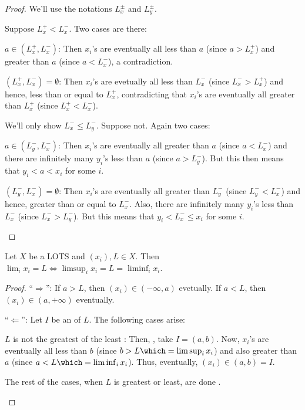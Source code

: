 	\begin{proof}
		We'll use the notations $L^\pm_x$ and $L^\pm_y$.
		\begin{mylist}
			\item Suppose $L^+_x < L^-_x$. Two cases are there:
			\begin{mylist}
				\item $a\in (L^+_x, L^-_x)$: Then $x_i$'s are eventually all less than $a$ (since $a > L^+_x$) and greater than $a$ (since $a < L^-_x$), a contradiction.
				
				\item $(L^+_x, L^-_x) = \emptyset$: Then $x_i$'s are evetually all less than $L^-_x$ (since $L^-_x > L^+_x$) and hence, less than or equal to $L^+_x$, contradicting that $x_i$'s are eventually all greater than $L^+_x$ (since $L^+_x < L^-_x$).
			\end{mylist}
			
			
			\item We'll only show $L^-_x\le L^-_y$. Suppose not. Again two cases:
			\begin{mylist}
				\item $a\in (L^-_y, L^-_x)$: Then $x_i$'s are eventually all greater than $a$ (since $a < L^-_x$) and there are infinitely many $y_i$'s less than $a$ (since $a > L^-_y$). But this then means that $y_i < a < x_i$ for some $i$.
				
				\item $(L^-_y, L^-_x) = \emptyset$: Then $x_i$'s are eventually all greater than $L^-_y$ (since $L^-_y < L^-_x$) and hence, greater than or equal to $L^-_x$. Also, there are infinitely many $y_i$'s less than $L^-_x$ (since $L^-_x > L^-_y$). But this means that $y_i < L^-_x\le x_i$ for some $i$.
				\qedhere
			\end{mylist}
		\end{mylist}
	\end{proof}
	
	
	\begin{prp}
		Let $X$ be a LOTS and $(x_i), L\in X$. Then $\lim_i x_i = L\iff \limsup_i x_i = L = \liminf_i x_i$.
	\end{prp}
	
	\begin{proof}
		``$\Rightarrow$'': If $a > L$, then $(x_i)\in (-\infty, a)$ evetually. If $a < L$, then $(x_i)\in (a, +\infty)$ eventually.
		
		``$\Leftarrow$'': Let $I$ be an \onbd of $L$. The following cases arise:
		\begin{mylist}
			\item $L$ is not the greatest of the least \elt: Then, \wlogg, take $I = (a, b)$. Now, $x_i$'s are eventually all less than $b$ (since $b > L \which = \limsup_i x_i$) and also greater than $a$ (since $a < L\which = \liminf_i x_i$). Thus, eventually, $(x_i)\in (a, b) = I$.
			
			\item The rest of the cases, when $L$ is greatest or least, are done \lly.\qedhere
		\end{mylist}
	\end{proof}
	
